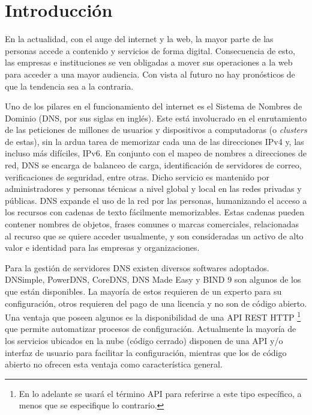 \chapter{Introducción}\label{chapter:introduction}

En la actualidad, con el auge del internet y la web, la mayor parte de las personas accede a contenido y servicios de forma digital. Consecuencia de esto, las empresas e instituciones se ven obligadas a mover sus operaciones a la web para acceder a una mayor audiencia. Con vista al futuro no hay pronósticos de que la tendencia sea a la contraria.

Uno de los pilares en el funcionamiento del internet es el Sistema de Nombres de Dominio (DNS, por sus siglas en inglés). Este está involucrado en el enrutamiento de las peticiones de millones de usuarios y dispositivos a computadoras (o \textit{clusters} de estas), sin la ardua tarea de memorizar cada una de las direcciones IPv4 y, las incluso más difíciles, IPv6. En conjunto con el mapeo de nombres a direcciones de red, DNS se encarga de balanceo de carga, identificación de servidores de correo, verificaciones de seguridad, entre otras. Dicho servicio es mantenido por administradores y personas técnicas a nivel global y local en las redes privadas y públicas. DNS expande el uso de la red por las personas, humanizando el acceso a los recursos con cadenas de texto fácilmente memorizables. Estas cadenas pueden contener nombres de objetos, frases comunes o marcas comerciales, relacionadas al recurso que se quiere acceder usualmente, y son consideradas un activo de alto valor e identidad para las empresas y organizaciones.

Para la gestión de servidores DNS existen diversos softwares adoptados. DNSimple, PowerDNS, CoreDNS, DNS Made Easy y BIND 9 son algunos de los que están disponibles. La mayoría de estos requieren de un experto para su configuración, otros requieren del pago de una licencia y no son de código abierto. Una ventaja que poseen algunos es la disponibilidad de una API REST HTTP \footnote{En lo adelante se usará el término API para referirse a este tipo específico, a menos que se especifique lo contrario.} que permite automatizar procesos de configuración. Actualmente la mayoría de los servicios ubicados en la nube (código cerrado) disponen de una API y/o interfaz de usuario para facilitar la configuración, mientras que los de código abierto no ofrecen esta ventaja como característica general.

